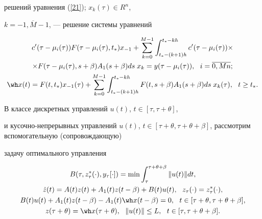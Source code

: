решений уравнения (\ref{21}); $x_{k}(\tau) \in R^n$,


$k=\overline{-1,M-1}$, --- решение системы уравнений


\begin{gather*}


c'(\tau-\mu_i(\tau))F(\tau-\mu_i(\tau),


t_*)x_{-1}+\sum_{k=0}^{M-1}\int_{t_*-(k+1)h}^{t_*-kh}


c'(\tau-\mu_i(\tau))\times \\


%


\times F(\tau-\mu_i(\tau),s+\beta)A_{1}(s+\beta)ds \;


x_k=y(\tau-\mu_{i}(\tau)),\ \ i=\overline{0,Mn}; \\


%


\wh x(t)=F(t,t_*)x_{-1}(\tau)+\sum^{M-1}_{k=0}


\int_{t_*-(k+1)h}^{t_*-kh}


F(t,s+\beta)A_1(s+\beta)ds \; x_{k}(\tau),\ \ t \ge t_*.


\end{gather*}





В классе дискретных управлений $u(t)$, $t \in [\tau, \tau+\theta]$, \tts{[}


и кусочно-непрерывных управлений $u(t)$, $t \in [\tau+\theta,


\tau+\theta+\beta]$, рассмотрим вспомогательную (сопровождающую)


задачу оптимального управления


\begin{gather}


B(\tau,z_{\tau}^*(\cdot), y_\tau[\cdot]) = \min


\int_{\tau}^{\tau+\theta+\beta} \|u(t)\| dt, \notag \\


%


\label{29}


\Dot z(t)=A(t)z(t)+A_1(t)z(t-\beta)+B(t)u(t),


\ \ z_{\tau}(\cdot)=z_{\tau}^*(\cdot), \\


%


B(t)u(t)+A_{1}(t)z(t-\beta)-A_1(t)\wh x(t-\beta)=0,\ \ t \in


[\tau+\theta, \tau+\theta+\beta], \notag \\


%


z(\tau+\theta)=\wh x(\tau+\theta),\ \ \|u(t)\| \le L,\ \ t \in


[\tau,\tau+\theta+\beta].\notag


\end{gather}


